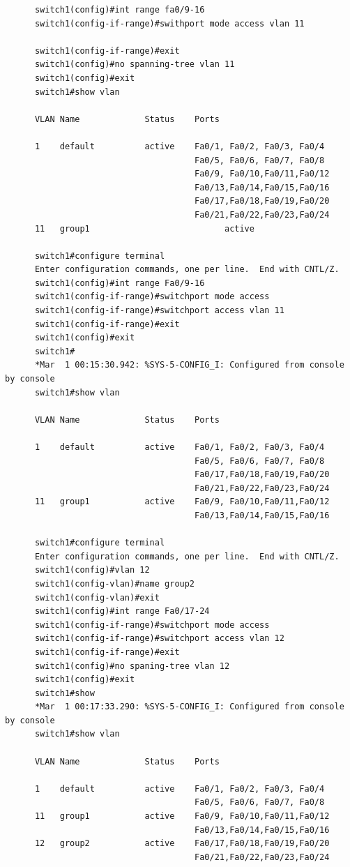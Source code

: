 \documentclass{jlreq}
\begin{document}
      \begin{lstlisting}
      switch1(config)#int range fa0/9-16 
      switch1(config-if-range)#swithport mode access vlan 11

      switch1(config-if-range)#exit
      switch1(config)#no spanning-tree vlan 11
      switch1(config)#exit
      switch1#show vlan

      VLAN Name             Status    Ports
    
      1    default          active    Fa0/1, Fa0/2, Fa0/3, Fa0/4
                                      Fa0/5, Fa0/6, Fa0/7, Fa0/8
                                      Fa0/9, Fa0/10,Fa0/11,Fa0/12
                                      Fa0/13,Fa0/14,Fa0/15,Fa0/16
                                      Fa0/17,Fa0/18,Fa0/19,Fa0/20
                                      Fa0/21,Fa0/22,Fa0/23,Fa0/24
      11   group1                           active    

      switch1#configure terminal
      Enter configuration commands, one per line.  End with CNTL/Z.
      switch1(config)#int range Fa0/9-16
      switch1(config-if-range)#switchport mode access
      switch1(config-if-range)#switchport access vlan 11
      switch1(config-if-range)#exit
      switch1(config)#exit
      switch1#
      *Mar  1 00:15:30.942: %SYS-5-CONFIG_I: Configured from console by console
      switch1#show vlan

      VLAN Name             Status    Ports
    
      1    default          active    Fa0/1, Fa0/2, Fa0/3, Fa0/4
                                      Fa0/5, Fa0/6, Fa0/7, Fa0/8
                                      Fa0/17,Fa0/18,Fa0/19,Fa0/20
                                      Fa0/21,Fa0/22,Fa0/23,Fa0/24
      11   group1           active    Fa0/9, Fa0/10,Fa0/11,Fa0/12
                                      Fa0/13,Fa0/14,Fa0/15,Fa0/16
      
      switch1#configure terminal
      Enter configuration commands, one per line.  End with CNTL/Z.
      switch1(config)#vlan 12
      switch1(config-vlan)#name group2
      switch1(config-vlan)#exit
      switch1(config)#int range Fa0/17-24
      switch1(config-if-range)#switchport mode access
      switch1(config-if-range)#switchport access vlan 12
      switch1(config-if-range)#exit
      switch1(config)#no spaning-tree vlan 12
      switch1(config)#exit
      switch1#show 
      *Mar  1 00:17:33.290: %SYS-5-CONFIG_I: Configured from console by console
      switch1#show vlan

      VLAN Name             Status    Ports
      
      1    default          active    Fa0/1, Fa0/2, Fa0/3, Fa0/4
                                      Fa0/5, Fa0/6, Fa0/7, Fa0/8
      11   group1           active    Fa0/9, Fa0/10,Fa0/11,Fa0/12
                                      Fa0/13,Fa0/14,Fa0/15,Fa0/16
      12   group2           active    Fa0/17,Fa0/18,Fa0/19,Fa0/20
                                      Fa0/21,Fa0/22,Fa0/23,Fa0/24

    \end{lstlisting}
\end{document}
